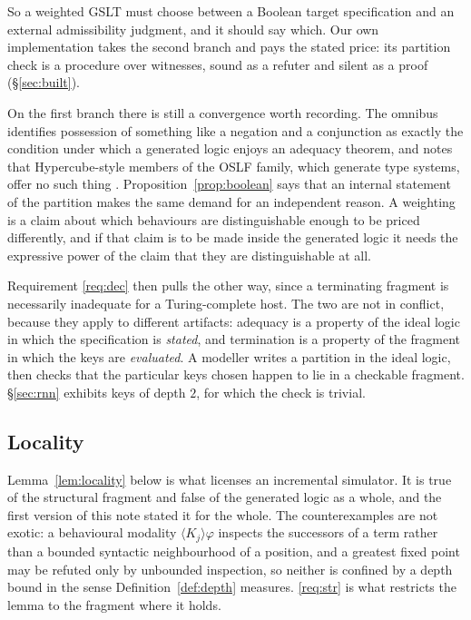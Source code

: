 \documentclass[11pt,a4paper]{article}
\theoremstyle{plain}
\theoremstyle{definition}
\theoremstyle{remark}
\begin{document}
So a weighted GSLT must choose between a Boolean target specification and an external admissibility
judgment, and it should say which. Our own implementation takes the second branch and pays the stated
price: its partition check is a procedure over witnesses, sound as a refuter and silent as a proof
(\S\ref{sec:built}).

On the first branch there is still a convergence worth recording. The omnibus identifies possession
of something like a negation and a conjunction as exactly the condition under which a generated logic
enjoys an adequacy theorem, and notes that Hypercube-style members of the OSLF family, which generate
type systems, offer no such thing \cite{omnibus}. Proposition~\ref{prop:boolean} says that an
internal statement of the partition makes the same demand for an independent reason. A weighting is a
claim about which behaviours are distinguishable enough to be priced differently, and if that claim
is to be made inside the generated logic it needs the expressive power of the claim that they are
distinguishable at all.

Requirement \ref{req:dec} then pulls the other way, since a terminating fragment is necessarily
inadequate for a Turing-complete host. The two are not in conflict, because they apply to different
artifacts: adequacy is a property of the ideal logic in which the specification is \emph{stated},
and termination is a property of the fragment in which the keys are \emph{evaluated}. A modeller
writes a partition in the ideal logic, then checks that the particular keys chosen happen to lie in
a checkable fragment. \S\ref{sec:rnn} exhibits keys of depth $2$, for which the check is trivial.

\subsection{Locality}
\label{sec:locality}

Lemma~\ref{lem:locality} below is what licenses an incremental simulator. It is true of the
structural fragment and false of the generated logic as a whole, and the first version of this note
stated it for the whole. The counterexamples are not exotic: a behavioural modality
$\langle K_j\rangle\varphi$ inspects the successors of a term rather than a bounded syntactic
neighbourhood of a position, and a greatest fixed point may be refuted only by unbounded inspection,
so neither is confined by a depth bound in the sense Definition~\ref{def:depth} measures.
\ref{req:str} is what restricts the lemma to the fragment where it holds.
\end{document}
